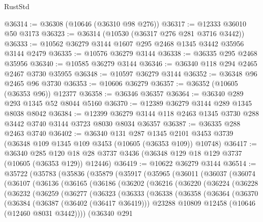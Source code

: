 \begin{lexlean}{RustStd}
\begin{coremodule}
@36314 := @36308 (@10646 (@36310 @98 @276))
@36317 := @12333 @36010 @50 @3173
@36323 := @36314 (@10530 (@36317 @276 @281 @3716 @3442))
@36333 := @10562 @36279 @3144 @1607 @295 @2468 @1345 @3442 @35956 @3144 @2479
@36335 := @10576 @36279 @3144
@36338 := @36335 @295 @2468 @35956
@36340 := @10585 @36279 @3144
@36346 := @36340 @118 @294 @2465 @2467 @3730 @35955
@36348 := @10597 @36279 @3144
@36352 := @36348 @96 @2465 @96 @3730
@36353 := @10606 @36279
@36357 := @36352 (@10605 (@36353 @96)) @12377
@36358 := @36346 @36357
@36364 := @36340 @289 @293 @1345 @52 @8044 @5160
@36370 := @12389 @36279 @3144 @289 @1345 @8038 @8042
@36384 := @12399 @36279 @3144 @118 @2463 @1345 @3730 @288 @3442 @3740 @3144 @3723 @8030 @8034 @36357
@36387 := @36335 @288 @2463 @3740
@36402 := @36340
    @131
    @287
    @1345
    @2101
    @3453
    @3739
    (@36348 @109 @1345 @109 @3453 (@10605 (@36353 @109)) @10748)
@36417 := @36340
    @285
    @120
    @18
    @28
    @3737
    @3436
    (@36348 @129 @18 @129 @3737 (@10605 (@36353 @129)) @12446)
@36419 := @10622 @36279 @3144
@36514 := @35722
    (@35783
      (@35836
        (@35879
          (@35917
            (@35965
              (@36011
                (@36037
                  (@36074
                    (@36107
                      (@36136
                        (@36165
                          (@36186
                            (@36202
                              (@36216
                                (@36220
                                  (@36224
                                    (@36228
                                      (@36232
                                        (@36259
                                          (@36277
                                            (@36323
                                              (@36333
                                                (@36338
                                                  (@36358
                                                    (@36364
                                                      (@36370
                                                        (@36384
                                                          (@36387 (@36402 (@36417 @36419)))
                                                          @23288
                                                          @10809
                                                          @12458
                                                          (@10646 (@12460 @8031 @3442))))
                                                      (@36340
                                                        @291

\end{coremodule}
\end{lexlean}
